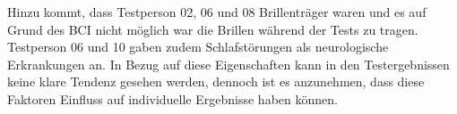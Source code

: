 Hinzu kommt, dass Testperson 02, 06 und 08 Brillenträger waren und es auf Grund des \acs{BCI} nicht möglich war die Brillen während der Tests zu tragen.
Testperson 06 und 10 gaben zudem Schlafstörungen als neurologische Erkrankungen an.
In Bezug auf diese Eigenschaften kann in den Testergebnissen keine klare Tendenz gesehen werden,
dennoch ist es anzunehmen, dass diese Faktoren Einfluss auf individuelle Ergebnisse haben können.\\











